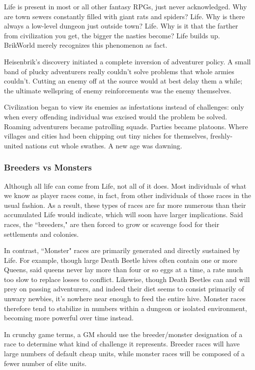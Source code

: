 \documentclass[12pt,a4paper,twocolumn]{article}
\begin{document}
Life is present in most or all other fantasy RPGs, just never acknowledged.  Why are town sewers constantly filled with giant rats and spiders?  Life.  Why is there always a low-level dungeon just outside town?  Life.  Why is it that the farther from civilization you get, the bigger the nasties become?  Life builds up.  BrikWorld merely recognizes this phenomenon as fact.

Heisenbrik's discovery initiated a complete inversion of adventurer policy.  A small band of plucky adventurers really couldn't solve problems that whole armies couldn't.  Cutting an enemy off at the source would at best delay them a while; the ultimate wellspring of enemy reinforcements was the enemy themselves.  

Civilization began to view its enemies as infestations instead of challenges: only when every offending individual was excised would the problem be solved.  Roaming adventurers became patrolling squads.  Parties became platoons.  Where villages and cities had been chipping out tiny niches for themselves, freshly-united nations cut whole swathes.  A new age was dawning.
\subsubsection{Breeders vs Monsters}
Although all life can come from Life, not all of it does.  Most individuals of what we know as player races come, in fact, from other individuals of those races in the usual fashion.  As a result, these types of races are far more numerous than their accumulated Life would indicate, which will soon have larger implications.  Said races, the ``breeders," are then forced to grow or scavenge food for their settlements and colonies.

In contrast, ``Monster" races are primarily generated and directly sustained by Life.  For example, though large Death Beetle hives often contain one or more Queens, said queens never lay more than four or so eggs at a time, a rate much too slow to replace losses to conflict.  Likewise, though Death Beetles can and will prey on passing adventurers, and indeed their diet seems to consist primarily of unwary newbies, it's nowhere near enough to feed the entire hive.  Monster races therefore tend to stabilize in numbers within a dungeon or isolated environment, becoming more powerful over time instead.

In crunchy game terms, a GM should use the breeder/monster designation of a race to determine what kind of challenge it represents.  Breeder races will have large numbers of default cheap units, while monster races will be composed of a fewer number of elite units.
\end{document}
